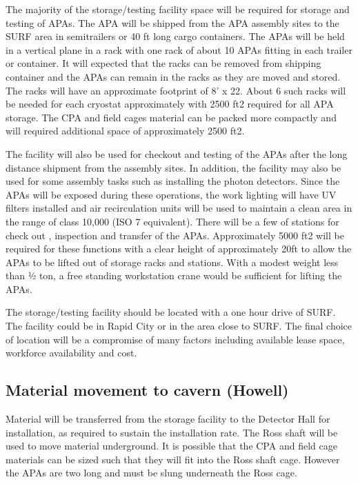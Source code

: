 The majority of the storage/testing facility space will be required for storage and testing of APAs. The APA will be shipped from the APA assembly sites to the SURF area in semitrailers or 40 ft long cargo containers. The APAs 
will be held in a vertical plane in a rack with one rack of about 10 APAs fitting in each trailer or container. It will expected that the racks can be removed from shipping container and the APAs can remain in the racks as they are 
moved and stored.  The racks will have an approximate footprint of 8’ x 22. About 6 such racks will be needed for each cryostat approximately with 2500 ft2 required for all APA storage. The CPA and field cages material can be packed more compactly and will required additional space of approximately 2500 ft2.

The facility will also be used for checkout and testing of the APAs after the long distance shipment from the assembly sites. In addition, the facility may also be used for some assembly tasks such as installing the photon 
detectors. Since the APAs will be exposed during these operations, the work lighting will have UV filters installed and air recirculation units will be used to maintain a clean area in the range of class 10,000 (ISO 7 equivalent). 
There will be a few of stations for check out , inspection and transfer of the APAs. Approximately 5000 ft2 will be required for these functions with a clear height of approximately 20ft to allow the APAs to be lifted out of storage 
racks and stations. With a modest weight less than ½ ton, a free standing workstation crane would be sufficient for lifting the APAs.

The storage/testing facility should be located with a one hour drive of SURF. The facility could be in Rapid City or in the area close to SURF. The final choice of location will be a compromise of many factors including available 
lease space, workforce availability and cost.

\subsection{Material movement to cavern (Howell)}
\label{fd:install:fsinstall:mat:movement}

Material will be transferred from the storage facility to the Detector Hall for installation, as required to sustain the installation rate. The Ross shaft will be used to move material underground. It is possible that the CPA and field cage 
materials can be sized such that they will fit into the Ross shaft cage. However the APAs are two long and must be slung underneath the Ross cage. 


